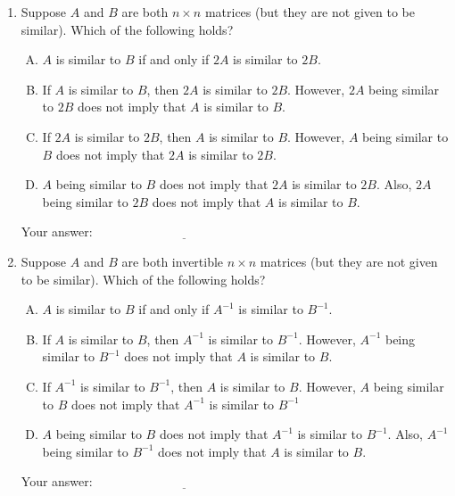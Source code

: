\documentclass[10pt]{amsart}
\begin{document}
\begin{enumerate}
\item Suppose $A$ and $B$ are both $n \times n$ matrices (but they are
  not given to be similar). Which of the following holds?

  \begin{enumerate}[(A)]
  \item $A$ is similar to $B$ if and only if $2A$ is similar to $2B$.
  \item If $A$ is similar to $B$, then $2A$ is similar to
    $2B$. However, $2A$ being similar to $2B$ does not imply that
    $A$ is similar to $B$.
  \item If $2A$ is similar to $2B$, then $A$ is similar to
    $B$. However, $A$ being similar to $B$ does not imply that $2A$
    is similar to $2B$.
  \item $A$ being similar to $B$ does not imply that $2A$ is similar
    to $2B$. Also, $2A$ being similar to $2B$ does not imply that
    $A$ is similar to $B$.
  \end{enumerate}

  \vspace{0.1in}
  Your answer: $\underline{\qquad\qquad\qquad\qquad\qquad\qquad\qquad}$
  \vspace{0.1in}

\item Suppose $A$ and $B$ are both invertible $n \times n$ matrices
  (but they are not given to be similar). Which of the following
  holds?

  \begin{enumerate}[(A)]
  \item $A$ is similar to $B$ if and only if $A^{-1}$ is similar to $B^{-1}$.
  \item If $A$ is similar to $B$, then $A^{-1}$ is similar to
    $B^{-1}$. However, $A^{-1}$ being similar to $B^{-1}$ does not
    imply that $A$ is similar to $B$.
  \item If $A^{-1}$ is similar to $B^{-1}$, then $A$ is similar to
    $B$. However, $A$ being similar to $B$ does not imply that
    $A^{-1}$ is similar to $B^{-1}$
  \item $A$ being similar to $B$ does not imply that $A^{-1}$ is
    similar to $B^{-1}$. Also, $A^{-1}$ being similar to $B^{-1}$ does
    not imply that $A$ is similar to $B$.
  \end{enumerate}

  \vspace{0.1in}
  Your answer: $\underline{\qquad\qquad\qquad\qquad\qquad\qquad\qquad}$
  \vspace{0.1in}


\end{enumerate}
\end{document}
